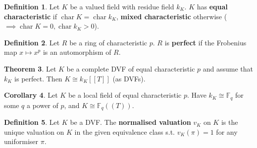 \documentclass[a4paper]{article}
\theoremstyle{definition}
\newtheorem{definition}{Definition}
\theoremstyle{default}
\newtheorem{theorem}[definition]{Theorem}
\newtheorem{corollary}[definition]{Corollary}
\theoremstyle{remark}
\DeclareMathOperator{\characteristic}{char}
\begin{document}
\begin{definition}
	Let $K$ be a valued field with residue field $k_K$.
	$K$ has \textbf{equal characteristic} if $\characteristic K = \characteristic k_K$,
	\textbf{mixed characteristic} otherwise ($\implies \characteristic K =0, \characteristic k_K > 0$).
\end{definition}

\begin{definition}
	Let $R$ be a ring of characteristic $p$.
	$R$ is \textbf{perfect} if the Frobenius map $x \mapsto x^p$ is an automorphism of $R$.
\end{definition}

\begin{theorem}
	Let $K$ be a complete DVF of equal characteristic $p$ and assume that $k_K$ is perfect.
	Then $K \cong k_K[[T]]$ (as DVFs).
\end{theorem}

\begin{corollary}
	Let $K$ be a local field of equal characteristic $p$.
	Have $k_K \cong \mathbb{F}_q$ for some $q$ a power of $p$,
	and $K \cong \mathbb{F}_q((T))$.
\end{corollary}

\begin{definition}
	Let $K$ be a DVF.
	The \textbf{normalised valuation} $v_K$ on $K$ is the unique valuation on $K$ in the given equivalence class
	s.t. $v_K(\pi) = 1$ for any uniformiser $\pi$.
\end{definition}
\end{document}
